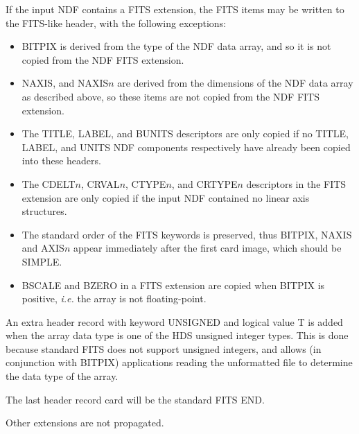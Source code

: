 {{{{            \sstitem
               If the input NDF contains a FITS extension, the FITS items
               may be written to the FITS-like header, with the following
               exceptions:
               \begin{itemize}
               \item BITPIX is derived from the type of the NDF data array,
               and so it is not copied from the NDF FITS extension.
               \item NAXIS, and NAXIS$n$ are derived from the dimensions of the
               NDF data array as described above, so these items are not
               copied from the NDF FITS extension.
               \item The TITLE, LABEL, and BUNITS descriptors are only copied
               if no TITLE, LABEL, and UNITS NDF components respectively
               have already been copied into these headers.
               \item The CDELT$n$, CRVAL$n$, CTYPE$n$, and CRTYPE$n$ descriptors
               in the FITS extension are only copied if the input NDF
               contained no linear axis structures.
               \item The standard order of the FITS keywords is preserved,
               thus BITPIX, NAXIS and AXIS$n$ appear immediately after the
               first card image, which should be SIMPLE.
               \item BSCALE and BZERO in a FITS extension are copied when
               BITPIX is positive, {\it i.e.} the array is not floating-point.
               \end{itemize}

            \sstitem
               An extra header record with keyword UNSIGNED and logical
               value T is added when the array data type is one of the HDS
               unsigned integer types.  This is done because standard FITS
               does not support unsigned integers, and allows (in conjunction
               with BITPIX) applications reading the unformatted file to
               determine the data type of the array.

            \sstitem
               The last header record card will be the standard FITS END.
         }

         \sstitem
            Other extensions are not propagated.
      }
   }
}

